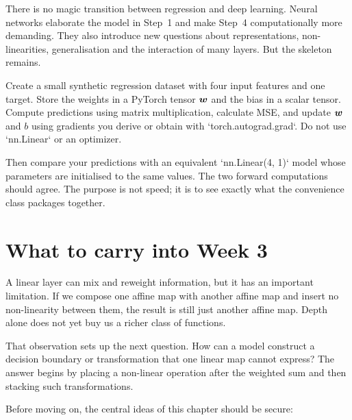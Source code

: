 There is no magic transition between regression and deep learning. Neural networks elaborate the model in Step~1 and make Step~4 computationally more demanding. They also introduce new questions about representations, non-linearities, generalisation and the interaction of many layers. But the skeleton remains.

\begin{optionalexercise}[title={Optional coding --- write the loop without an optimiser}]
Create a small synthetic regression dataset with four input features and one target. Store the weights in a PyTorch tensor \(\bm{w}\) and the bias in a scalar tensor. Compute predictions using matrix multiplication, calculate MSE, and update \(\bm{w}\) and \(b\) using gradients you derive or obtain with `torch.autograd.grad`. Do not use `nn.Linear` or an optimizer.

Then compare your predictions with an equivalent `nn.Linear(4, 1)` model whose parameters are initialised to the same values. The two forward computations should agree. The purpose is not speed; it is to see exactly what the convenience class packages together.
\end{optionalexercise}

\section{What to carry into Week 3}

A linear layer can mix and reweight information, but it has an important limitation. If we compose one affine map with another affine map and insert no non-linearity between them, the result is still just another affine map. Depth alone does not yet buy us a richer class of functions.

That observation sets up the next question. How can a model construct a decision boundary or transformation that one linear map cannot express? The answer begins by placing a non-linear operation after the weighted sum and then stacking such transformations.

Before moving on, the central ideas of this chapter should be secure:

